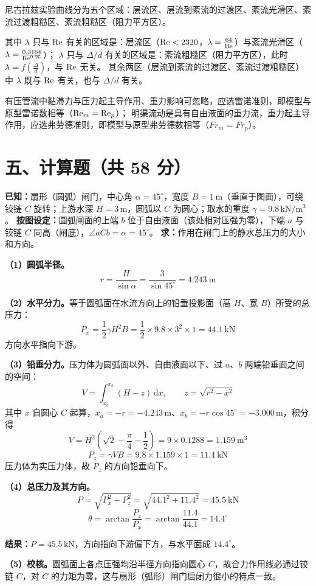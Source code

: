 \begin{jie}
尼古拉兹实验曲线分为五个区域：层流区、层流到紊流的过渡区、紊流光滑区、紊流过渡粗糙区、紊流粗糙区（阻力平方区）。

其中 $\lambda$ 只与 $\mathrm{Re}$ 有关的区域是：层流区（$\mathrm{Re}<2320$，$\lambda=\frac{64}{\mathrm{Re}}$）与紊流光滑区（$\lambda=\frac{0.3164}{\mathrm{Re}^{0.25}}$）；
$\lambda$ 只与 $\Delta/d$ 有关的区域是：紊流粗糙区（阻力平方区），此时 $\lambda=f\left(\frac{\Delta}{d}\right)$，与 $\mathrm{Re}$ 无关。
其余两区（层流到紊流的过渡区、紊流过渡粗糙区）中 $\lambda$ 既与 $\mathrm{Re}$ 有关，也与 $\Delta/d$ 有关。
\end{jie}


\begin{jie}
有压管流中黏滞力与压力起主导作用、重力影响可忽略，应选雷诺准则，即模型与原型雷诺数相等（$\mathrm{Re}_m=\mathrm{Re}_p$）；
明渠流动是具有自由液面的重力流，重力起主导作用，应选弗劳德准则，即模型与原型弗劳德数相等（$Fr_m=Fr_p$）。
\end{jie}

\section{五、计算题（共 58 分）}


\begin{jie}
\textbf{已知：}扇形（圆弧）闸门，中心角 $\alpha=45^\circ$，宽度 $B=1\,\mathrm{m}$（垂直于图面），可绕铰链 $C$ 旋转；上游水深 $H=3\,\mathrm{m}$，圆弧以 $C$ 为圆心；取水的重度 $\gamma=9.8\,\mathrm{kN/m^3}$。
\textbf{按图设定：}圆弧闸面的上端 $b$ 位于自由液面（该处相对压强为零），下端 $a$ 与铰链 $C$ 同高（闸底），$\angle aCb=\alpha=45^\circ$。
\textbf{求：}作用在闸门上的静水总压力的大小和方向。

\textbf{（1）圆弧半径。}
\[
r=\frac{H}{\sin\alpha}=\frac{3}{\sin45^\circ}=4.243\ \mathrm{m}
\]

\textbf{（2）水平分力。}等于圆弧面在水流方向上的铅垂投影面（高 $H$、宽 $B$）所受的总压力：
\[
P_x=\frac{1}{2}\gamma H^2B=\frac{1}{2}\times9.8\times3^2\times1=44.1\ \mathrm{kN}
\]
方向水平指向下游。

\textbf{（3）铅垂分力。}压力体为圆弧面以外、自由液面以下、过 $a$、$b$ 两端铅垂面之间的空间：
\[
V=\int_{x_a}^{x_b}(H-z)\,\mathrm{d}x,\qquad z=\sqrt{r^2-x^2}
\]
其中 $x$ 自圆心 $C$ 起算，$x_a=-r=-4.243\,\mathrm{m}$、$x_b=-r\cos45^\circ=-3.000\,\mathrm{m}$，积分得
\[
V=H^2\left(\sqrt{2}-\frac{\pi}{4}-\frac{1}{2}\right)=9\times0.1288=1.159\ \mathrm{m^3}
\]
\[
P_z=\gamma VB=9.8\times1.159\times1=11.4\ \mathrm{kN}
\]
压力体为实压力体，故 $P_z$ 的方向铅垂向下。

\textbf{（4）总压力及其方向。}
\[
P=\sqrt{P_x^2+P_z^2}=\sqrt{44.1^2+11.4^2}=45.5\ \mathrm{kN}
\]
\[
\theta=\arctan\frac{P_z}{P_x}=\arctan\frac{11.4}{44.1}=14.4^\circ
\]

\textbf{结果：}$P=45.5\,\mathrm{kN}$，方向指向下游偏下方，与水平面成 $14.4^\circ$。

\textbf{（5）校核。}圆弧面上各点压强均沿半径方向指向圆心 $C$，故合力作用线必通过铰链 $C$，对 $C$ 的力矩为零，这与扇形（弧形）闸门启闭力很小的特点一致。
\end{jie}

